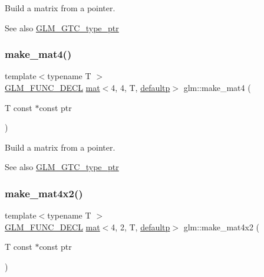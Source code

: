 Build a matrix from a pointer. \begin{DoxySeeAlso}{See also}
\hyperlink{group__gtc__type__ptr}{G\+L\+M\+\_\+\+G\+T\+C\+\_\+type\+\_\+ptr} 
\end{DoxySeeAlso}
\mbox{\label{group__gtc__type__ptr_gae7bcedb710d1446c87fd1fc93ed8ee9a}} 
\subsubsection{\texorpdfstring{make\+\_\+mat4()}{make\_mat4()}}
{\footnotesize\ttfamily template$<$typename T $>$ \\
\hyperlink{setup_8hpp_ab2d052de21a70539923e9bcbf6e83a51}{G\+L\+M\+\_\+\+F\+U\+N\+C\+\_\+\+D\+E\+CL} \hyperlink{structglm_1_1mat}{mat}$<$4, 4, T, \hyperlink{namespaceglm_a36ed105b07c7746804d7fdc7cc90ff25a9d21ccd8b5a009ec7eb7677befc3bf51}{defaultp}$>$ glm\+::make\+\_\+mat4 (\begin{DoxyParamCaption}\item[{T const $\ast$const}]{ptr }\end{DoxyParamCaption})}

Build a matrix from a pointer. \begin{DoxySeeAlso}{See also}
\hyperlink{group__gtc__type__ptr}{G\+L\+M\+\_\+\+G\+T\+C\+\_\+type\+\_\+ptr} 
\end{DoxySeeAlso}
\mbox{\label{group__gtc__type__ptr_ga8b34c9b25bf3310d8ff9c828c7e2d97c}} 
\subsubsection{\texorpdfstring{make\+\_\+mat4x2()}{make\_mat4x2()}}
{\footnotesize\ttfamily template$<$typename T $>$ \\
\hyperlink{setup_8hpp_ab2d052de21a70539923e9bcbf6e83a51}{G\+L\+M\+\_\+\+F\+U\+N\+C\+\_\+\+D\+E\+CL} \hyperlink{structglm_1_1mat}{mat}$<$4, 2, T, \hyperlink{namespaceglm_a36ed105b07c7746804d7fdc7cc90ff25a9d21ccd8b5a009ec7eb7677befc3bf51}{defaultp}$>$ glm\+::make\+\_\+mat4x2 (\begin{DoxyParamCaption}\item[{T const $\ast$const}]{ptr }\end{DoxyParamCaption})}

